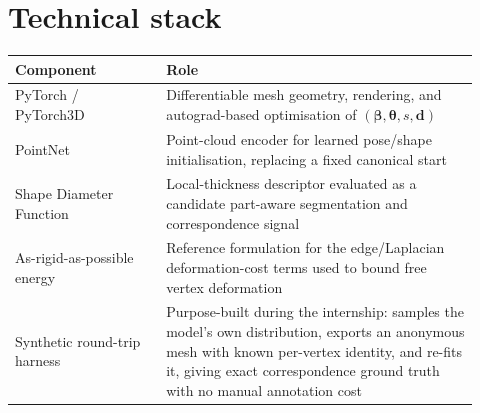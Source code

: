 \section{Technical stack}

\begin{center}
\begin{tabular}{@{}p{0.30\linewidth}p{0.62\linewidth}@{}}
\toprule
\textbf{Component} & \textbf{Role} \\
\midrule
PyTorch / PyTorch3D~\cite{pytorch3d} & Differentiable mesh geometry,
  rendering, and autograd-based optimisation of $(\bm\beta,\bm\theta,s,\mathbf d)$ \\
PointNet~\cite{pointnet} & Point-cloud encoder for learned pose/shape
  initialisation, replacing a fixed canonical start \\
Shape Diameter Function~\cite{sdf} & Local-thickness descriptor evaluated as
  a candidate part-aware segmentation and correspondence signal \\
As-rigid-as-possible energy~\cite{arap} & Reference formulation for the
  edge/Laplacian deformation-cost terms used to bound free vertex deformation \\
Synthetic round-trip harness & Purpose-built during the internship: samples
  the model's own distribution, exports an anonymous mesh with known
  per-vertex identity, and re-fits it, giving exact correspondence ground
  truth with no manual annotation cost \\
\bottomrule
\end{tabular}
\end{center}
